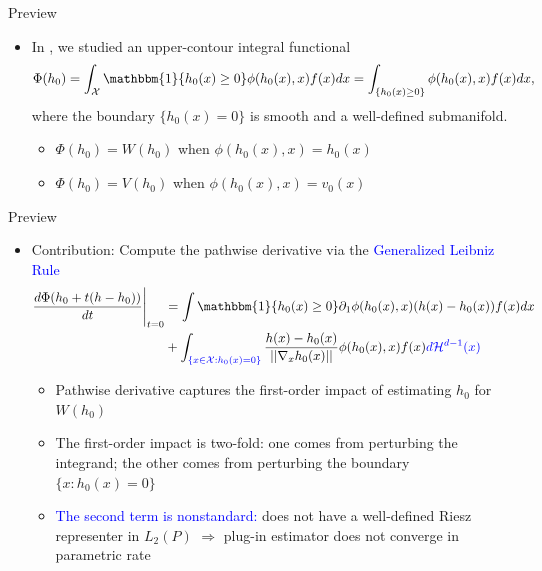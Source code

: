 \documentclass[aspectratio=169,xcolor=dvipsnames]{beamer}
\begin{document}
\begin{frame}{Preview}
    \begin{itemize}
        \item In \citet*{chen2025inference}, we studied an upper-contour integral functional 
            \[
                \Phi(h_0) = \int_\mathcal{X}\mathbbm{1}\{h_0(x) \geq 0\}\phi(h_0(x),x)f(x)dx = \int_{\{h_0(x) \geq 0\}}\phi(h_0(x),x)f(x)dx,
            \]
            where the boundary $\{h_0(x) = 0\}$ is smooth and a well-defined submanifold.
            \begin{itemize}
                \item[-] $\Phi(h_0) = W(h_0)$ when $\phi(h_0(x),x) = h_0(x)$
                \item[-] $\Phi(h_0) = V(h_0)$ when $\phi(h_0(x),x) = v_0(x)$
            \end{itemize}
    \end{itemize}
\end{frame}

\begin{frame}{Preview}
    \begin{itemize}
        \item Contribution: Compute the pathwise derivative via the \textcolor{blue}{Generalized Leibniz Rule}
            \begin{align*}
                \frac{d \Phi(h_0 + t(h-h_0))}{dt}\Bigg|_{t=0}   &= \int \mathbbm{1}\{h_0(x) \geq 0\}\partial_1\phi(h_0(x), x)(h(x) - h_0(x))f(x)dx\\
                &+ \int_{\textcolor{blue}{\{x\in \mathcal{X} :h_0(x) = 0\}}}\frac{h(x) - h_0(x)}{||\nabla_xh_0(x)||}\phi(h_0(x),x)f(x)\textcolor{blue}{d\mathcal{H}^{d-1}(x)}
            \end{align*}
            \begin{itemize}
                \item[-] Pathwise derivative captures the first-order impact of estimating $h_0$ for $W(h_0)$
                \item[-] The first-order impact is two-fold: one comes from perturbing the integrand; the other comes from perturbing the boundary $\{x:h_0(x)=0\}$
                \item[-] \textcolor{blue}{The second term is nonstandard:} does not have a well-defined Riesz representer in $L_2(P)$ $\Rightarrow$ plug-in estimator does not converge in parametric rate
            \end{itemize}
    \end{itemize}
\end{frame}
\end{document}
